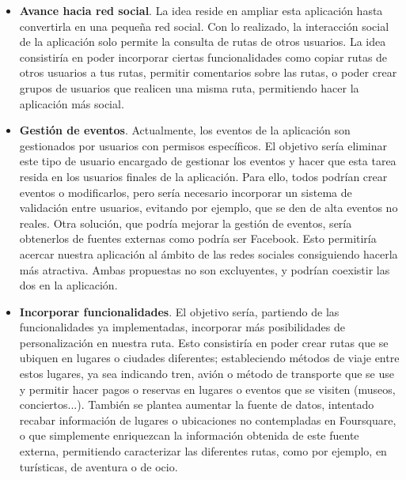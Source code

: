 \begin{itemize}
	\item \textbf{Avance hacia red social}. La idea reside en ampliar esta aplicación hasta convertirla en una pequeña red social. Con lo realizado, la interacción social de la aplicación solo permite la consulta de rutas de otros usuarios. La idea consistiría en poder incorporar ciertas funcionalidades como copiar rutas de otros usuarios a tus rutas, permitir comentarios sobre las rutas, o poder crear grupos de usuarios que realicen una misma ruta, permitiendo hacer la aplicación más social.
	
	\item \textbf{Gestión de eventos}. Actualmente, los eventos de la aplicación son gestionados por usuarios con permisos específicos. El objetivo sería eliminar este tipo de usuario encargado de gestionar los eventos y hacer que esta tarea resida en los usuarios finales de la aplicación. Para ello, todos podrían crear eventos o modificarlos, pero sería necesario incorporar un sistema de validación entre usuarios, evitando por ejemplo, que se den de alta eventos no reales. Otra solución, que podría mejorar la gestión de eventos, sería obtenerlos de fuentes externas como podría ser Facebook. Esto permitiría acercar nuestra aplicación al ámbito de las redes sociales consiguiendo hacerla más atractiva. Ambas propuestas no son excluyentes, y podrían coexistir las dos en la aplicación.

	\item \textbf{Incorporar funcionalidades}. El objetivo sería, partiendo de las funcionalidades ya implementadas, incorporar más posibilidades de personalización en nuestra ruta. Esto consistiría en poder crear rutas que se ubiquen en lugares o ciudades diferentes; estableciendo métodos de viaje entre estos lugares, ya sea indicando tren, avión o método de transporte que se use y permitir hacer pagos o reservas en lugares o eventos que se visiten (museos, conciertos...). También se plantea aumentar la fuente de datos, intentado recabar información de lugares o ubicaciones no contempladas en Foursquare, o que simplemente enriquezcan la información obtenida de este fuente externa, permitiendo caracterizar las diferentes rutas, como por ejemplo, en turísticas, de aventura o de ocio.

\end{itemize}












